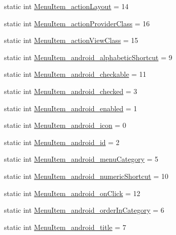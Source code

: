 \begin{DoxyCompactItemize}
static int \hyperlink{classandroid_1_1support_1_1v4_1_1R_1_1styleable_af194808a4ba1c7a693afbd147948aeb5}{Menu\+Item\+\_\+action\+Layout} = 14
\item 
static int \hyperlink{classandroid_1_1support_1_1v4_1_1R_1_1styleable_ae90ac3b2f2bea80a71d360cb82e35219}{Menu\+Item\+\_\+action\+Provider\+Class} = 16
\item 
static int \hyperlink{classandroid_1_1support_1_1v4_1_1R_1_1styleable_a083070b1aa74ecfc2abe1a5349047c5c}{Menu\+Item\+\_\+action\+View\+Class} = 15
\item 
static int \hyperlink{classandroid_1_1support_1_1v4_1_1R_1_1styleable_a3cf2935e744fb9f942bad0c47703e631}{Menu\+Item\+\_\+android\+\_\+alphabetic\+Shortcut} = 9
\item 
static int \hyperlink{classandroid_1_1support_1_1v4_1_1R_1_1styleable_ae164f5c1d244ba85f9dd11fcbd4c1852}{Menu\+Item\+\_\+android\+\_\+checkable} = 11
\item 
static int \hyperlink{classandroid_1_1support_1_1v4_1_1R_1_1styleable_ade997ec68b8ea842ccd85dcddfdaa360}{Menu\+Item\+\_\+android\+\_\+checked} = 3
\item 
static int \hyperlink{classandroid_1_1support_1_1v4_1_1R_1_1styleable_aabc00563415e16b30ecedaf11d6d9eb7}{Menu\+Item\+\_\+android\+\_\+enabled} = 1
\item 
static int \hyperlink{classandroid_1_1support_1_1v4_1_1R_1_1styleable_a3e063bea4cd93ef6a4f2e77cf1d904d4}{Menu\+Item\+\_\+android\+\_\+icon} = 0
\item 
static int \hyperlink{classandroid_1_1support_1_1v4_1_1R_1_1styleable_a2fb5698551ba92fc84a909e0e0707a7b}{Menu\+Item\+\_\+android\+\_\+id} = 2
\item 
static int \hyperlink{classandroid_1_1support_1_1v4_1_1R_1_1styleable_a8ac9469c005cff049480dd49956827cf}{Menu\+Item\+\_\+android\+\_\+menu\+Category} = 5
\item 
static int \hyperlink{classandroid_1_1support_1_1v4_1_1R_1_1styleable_a1f4749c61207ae550ca1399836eee0d3}{Menu\+Item\+\_\+android\+\_\+numeric\+Shortcut} = 10
\item 
static int \hyperlink{classandroid_1_1support_1_1v4_1_1R_1_1styleable_acb8f5023cfce902cf351f49364d68143}{Menu\+Item\+\_\+android\+\_\+on\+Click} = 12
\item 
static int \hyperlink{classandroid_1_1support_1_1v4_1_1R_1_1styleable_ab9d9472a2e90c5fdcf27802d8eb81618}{Menu\+Item\+\_\+android\+\_\+order\+In\+Category} = 6
\item 
static int \hyperlink{classandroid_1_1support_1_1v4_1_1R_1_1styleable_a42591e9c083d69eb5cea71e1accd2d2b}{Menu\+Item\+\_\+android\+\_\+title} = 7

\end{DoxyCompactItemize}
